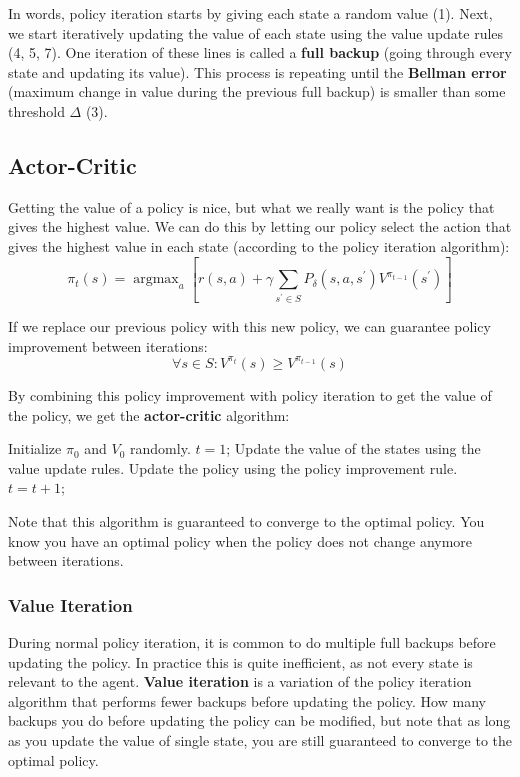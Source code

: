 \documentclass[12pt]{article}
\DeclareMathOperator*{\argmax}{argmax}
\begin{document}
\newpage
\noindent
In words, policy iteration starts by giving each state a random value (1).
Next, we start iteratively updating the value of each state using the value update rules (4, 5, 7).
One iteration of these lines is called a \textbf{full backup} (going through every state and updating its value).
This process is repeating until the \textbf{Bellman error} (maximum change in value during the previous full backup) is smaller than some threshold $\Delta$ (3).

\subsection{Actor-Critic}
Getting the value of a policy is nice, but what we really want is the policy that gives the highest value.
We can do this by letting our policy select the action that gives the highest value in each state (according to the policy iteration algorithm):
\[ \pi_t(s) = \argmax_a \left[ r(s, a) + \gamma \sum_{s^\prime \in S} P_\delta(s, a, s^\prime) V^{\pi_{t - 1}}(s^\prime) \right] \]

\noindent
If we replace our previous policy with this new policy, we can guarantee policy improvement between iterations:
\[ \forall s \in S : V^{\pi_t}(s) \geq V^{\pi_{t - 1}}(s) \]

\noindent
By combining this policy improvement with policy iteration to get the value of the policy, we get the \textbf{actor-critic} algorithm:

\begin{algorithm}
    \caption{Actor-Critic Policy Iteration}
    \begin{algorithmic}[1]
        \State Initialize $\pi_0$ and $V_0$ randomly.
        \State $t = 1$;
            \State Update the value of the states using the value update rules. 
            \State Update the policy using the policy improvement rule. 
            \State $t = t + 1$;
        \EndWhile
    \end{algorithmic}
\end{algorithm}

\noindent
Note that this algorithm is guaranteed to converge to the optimal policy.
You know you have an optimal policy when the policy does not change anymore between iterations.

\subsubsection{Value Iteration}
During normal policy iteration, it is common to do multiple full backups before updating the policy.
In practice this is quite inefficient, as not every state is relevant to the agent.
\textbf{Value iteration} is a variation of the policy iteration algorithm that performs fewer backups before updating the policy.
How many backups you do before updating the policy can be modified, but note that as long as you update the value of single state, you are still guaranteed to converge to the optimal policy.
\end{document}
